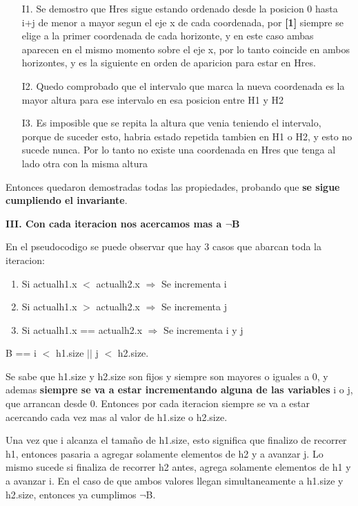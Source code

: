 \begin{enumerate}
\begin{itemize}
\item[I1.] Se demostro que Hres sigue estando ordenado desde la posicion 0 hasta i+j de menor a mayor segun el eje x de cada coordenada, por \textbf{[1]} siempre se elige a la primer coordenada de cada horizonte, y en este caso ambas aparecen en el mismo momento sobre el eje x, por lo tanto coincide en ambos horizontes, y es la siguiente en orden de aparicion para estar en Hres.
\item[I2.] Quedo comprobado que el intervalo que marca la nueva coordenada es la mayor altura para ese intervalo en esa posicion entre H1 y H2
\item[I3.] Es imposible que se repita la altura que venia teniendo el intervalo, porque de suceder esto, habria estado repetida tambien en H1 o H2, y esto no sucede nunca. Por lo tanto no existe una coordenada en Hres que tenga al lado otra con la misma altura
\end{itemize}
Entonces quedaron demostradas todas las propiedades, probando que \textbf{se sigue cumpliendo el invariante}.
\end{enumerate}
\newpage
\noindent \textbf{III. Con cada iteracion nos acercamos mas a $\neg$B}

En el pseudocodigo se puede observar que hay 3 casos que abarcan toda la iteracion:
\begin{enumerate}
\item Si actualh1.x $<$ actualh2.x $\Rightarrow$ Se incrementa i
\item Si actualh1.x $>$ actualh2.x $\Rightarrow$ Se incrementa j
\item Si actualh1.x == actualh2.x $\Rightarrow$ Se incrementa i y j
\end{enumerate}

B == i $<$ h1.size $\vert\vert$ j $<$ h2.size. 

Se sabe que h1.size y h2.size son fijos y siempre son mayores o iguales a 0, y ademas \textbf{siempre se va a estar incrementando alguna de las variables} i o j, que arrancan desde 0. Entonces por cada iteracion siempre se va a estar acercando cada vez mas al valor de h1.size o h2.size.

Una vez que i alcanza el tamaño de h1.size, esto significa que finalizo de recorrer h1, entonces pasaria a agregar solamente elementos de h2 y a avanzar j. Lo mismo sucede si finaliza de recorrer h2 antes, agrega solamente elementos de h1 y a avanzar i. En el caso de que ambos valores llegan simultaneamente a h1.size y h2.size, entonces ya cumplimos $\neg$B.
\bigskip

